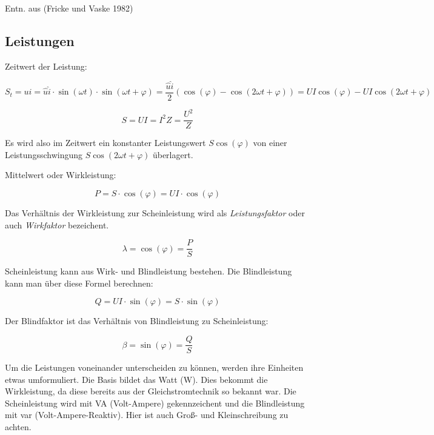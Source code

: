 \documentclass[
  ngerman,
  letterpaper,
]{scrbook}
\begin{document}
Entn. aus (Fricke und Vaske 1982)

\subsection{Leistungen}\label{leistungen}

Zeitwert der Leistung:

\[
S_t = u i = \hat{u} \hat{i} \cdot \sin(\omega t) \cdot \sin(\omega t + \varphi) = \frac{\hat{u} \hat{i}}{2}
(\cos(\varphi) - \cos(2 \omega t + \varphi)) = UI \cos(\varphi) - UI \cos(2 \omega t + \varphi)
\]

\[S = U I = I^2 Z = \frac{U^2}{Z}\]

Es wird also im Zeitwert ein konstanter Leistungswert
\(S \cos(\varphi)\) von einer Leistungsschwingung \(S \cos(2 \omega t +
\varphi)\) überlagert.

Mittelwert oder Wirkleistung:

\[P = S \cdot \cos(\varphi) = U I \cdot \cos(\varphi)\]

Das Verhältnis der Wirkleistung zur Scheinleistung wird als
\emph{Leistungsfaktor} oder auch \emph{Wirkfaktor} bezeichent.

\[\lambda = \cos(\varphi) = \frac{P}{S}\]

Scheinleistung kann aus Wirk- und Blindleistung bestehen. Die
Blindleistung kann man über diese Formel berechnen:

\[Q = U I \cdot \sin(\varphi) = S \cdot \sin(\varphi)\]

Der Blindfaktor ist das Verhältnis von Blindleistung zu Scheinleistung:

\[\beta = \sin(\varphi) = \frac{Q}{S}\]

\begin{tcolorbox}[enhanced jigsaw, titlerule=0mm, rightrule=.15mm, toprule=.15mm, colback=white, toptitle=1mm, bottomrule=.15mm, coltitle=black, leftrule=.75mm, arc=.35mm, colbacktitle=quarto-callout-note-color!10!white, opacityback=0, bottomtitle=1mm, colframe=quarto-callout-note-color-frame, opacitybacktitle=0.6, breakable, title=\textcolor{quarto-callout-note-color}{\faInfo}\hspace{0.5em}{Hinweis}, left=2mm]

Um die Leistungen voneinander unterscheiden zu können, werden ihre
Einheiten etwas umformuliert. Die Basis bildet das Watt (W). Dies
bekommt die Wirkleistung, da diese bereits aus der Gleichstromtechnik so
bekannt war. Die Scheinleistung wird mit VA (Volt-Ampere) gekennzeichent
und die Blindleistung mit var (Volt-Ampere-Reaktiv). Hier ist auch Groß-
und Kleinschreibung zu achten.

\end{tcolorbox}
\end{document}
